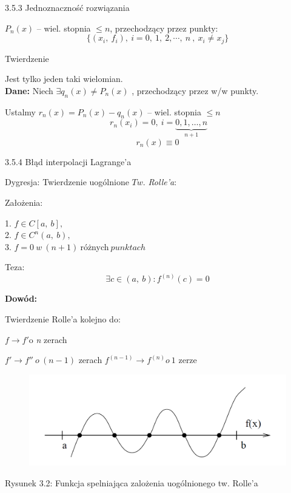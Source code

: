 \begin{frame}{3.5.3 Jednoznaczność rozwiązania}

$P_{n}(x)$ -- wiel. stopnia $\leq n$, przechodzący przez punkty:
$$
\{(x_{i},\ f_{i}),\ i=0,\ 1,\ 2,\cdots ,\ n\ ,\ x_{i}\neq x_{j}\}
$$

\begin{block}{Twierdzenie}

Jest tylko jeden taki wielomian.\\
\vspace{2mm}
\textbf{Dane:} Niech $\exists q_{n}(x)\neq P_{n}(x)$ , przechodzący przez w/w punkty.

Ustalmy $r_{n}(x)=P_{n}(x) - q_{n}(x)$ -- wiel. stopnia $\leq n$
$$
 \: r_{n}(x_{i})=0,\ i=\underbrace{0,1, \dots, n}_{n+1}
$$
$$
r_{n}(x) \equiv 0
$$
\end{block}
\end{frame}

\begin{frame}{3.5.4 Błąd interpolacji Lagrange'a}

\begin{block}
{Dygresja: Twierdzenie uogólnione $Tw$. {\it Rolle'a}:}

Założenia:
\begin{center}
1. $f\in C[a,\ b],$ \\
2. $f\in C^{n}(a,\ b),$  \\
3. $f=0\: w\: (n+1)\: $różnych$ \:punktach$
\end{center}


Teza:
$$
\exists c\in(a,\ b):f^{(n)}(c)=0
$$
\end{block}
\textbf{Dowód:}

Twierdzenie Rolle'a kolejno do:

$f \rightarrow f'\mathrm{o}$ {\it n} zerach

$f' \rightarrow f'' \:o\:(n-1)$ zerach \newline
$f^{(n-1)} \rightarrow f^{(n)} o\: 1$ zerze
 \end{frame}

 \begin{frame}
 \begin{figure}[h]
			\includegraphics[width=1 \linewidth]{img/3/interpol_3_5}
	\end{figure}
Rysunek 3.2: Funkcja spelniająca zalożenia uogólnionego tw. Rolle'a
 \end{frame}



